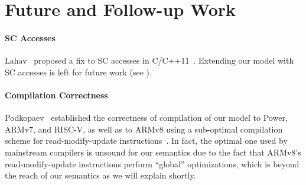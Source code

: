 \section{Future and Follow-up Work}\label{sec:discussion}


\paragraph{SC Accesses}

Lahav~\etal{} proposed a fix to SC accesses in C/C++11~\cite{rc11}.  Extending our model with SC
accesses is left for future work (see ).



\paragraph{Compilation Correctness}

Podkopaev~\etal{} established the correctness of compilation of our model to Power, ARMv7, and
RISC-V, as well as to ARMv8 using a sub-optimal compilation scheme for read-modify-update
instructions~\cite{imm}.  In fact, the optimal one used by mainstream compilers is unsound for our
semantics due to the fact that ARMv8's read-modify-update instructions perform ``global''
optimizations, which is beyond the reach of our semantics as we will explain shortly.





